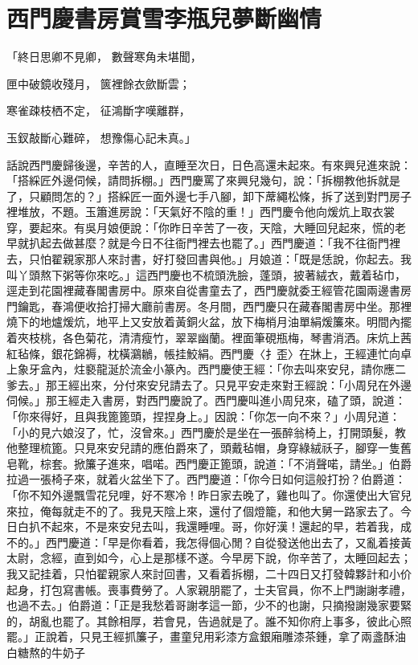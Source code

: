 %

\chapter{西門慶書房賞雪\KG 李瓶兒夢斷幽情}


「終日思卿不見卿，  數聲寒角未堪聞，

匣中破鏡收殘月，  篋裡餘衣歛斷雲；

寒雀疎枝栖不定，  征鴻斷字嘆離群，

玉釵敲斷心難碎，  想豫傷心記未真。」

話說西門慶歸後邊，辛苦的人，直睡至次日，日色高還未起來。有來興兒進來說：「搭綵匠外邊伺候，請問拆棚。」西門慶罵了來興兒幾句，說：「拆棚教他拆就是了，只顧問怎的？」搭綵匠一面外邊七手八腳，卸下蓆繩松條，拆了送到對門房子裡堆放，不題。玉簫進房說：「天氣好不陰的重！」西門慶令他向煖炕上取衣裳穿，要起來。有吳月娘便說：「你昨日辛苦了一夜，天陰，大睡回兒起來，慌的老早就扒起去做甚麼？就是今日不往衙門裡去也罷了。」西門慶道：「我不往衙門裡去，只怕翟親家那人來討書，好打發回書與他。」月娘道：「既是恁說，你起去。我叫丫頭熬下粥等你來吃。」這西門慶也不梳頭洗臉，蓬頭，披著絨衣，戴着毡巾，逕走到花園裡藏春閣書房中。原來自從書童去了，西門慶就委王經管花園兩邊書房門鑰匙，春鴻便收拾打掃大廳前書房。冬月間，西門慶只在藏春閣書房中坐。那裡燒下的地爐煖炕，地平上又安放着黃銅火盆，放下梅梢月油單絹煖簾來。明間內擺着夾枝桃，各色菊花，清清瘦竹，翠翠幽蘭。裡面筆硯瓶梅，琴書消洒。床炕上茜紅毡條，銀花錦褥，枕橫鸂鶒，帳挂鮫絹。西門慶〈扌歪〉在牀上，王經連忙向卓上象牙盒內，炷褻龍涎於流金小篆內。西門慶使王經：「你去叫來安兒，請你應二爹去。」那王經出來，分付來安兒請去了。只見平安走來對王經說：「小周兒在外邊伺候。」那王經走入書房，對西門慶說了。西門慶叫進小周兒來，磕了頭，說道：「你來得好，且與我篦篦頭，捏捏身上。」因說：「你怎一向不來？」小周兒道：「小的見六娘沒了，忙，沒曾來。」西門慶於是坐在一張醉翁椅上，打開頭髮，教他整理梳篦。只見來安兒請的應伯爵來了，頭戴毡帽，身穿綠絨祅子，腳穿一隻舊皂靴，棕套。掀簾子進來，唱喏。西門慶正篦頭，說道：「不消聲喏，請坐。」伯爵拉過一張椅子來，就着火盆坐下了。西門慶道：「你今日如何這般打扮？伯爵道：「你不知外邊飄雪花兒哩，好不寒冷！昨日家去晚了，雞也叫了。你還使出大官兒來拉，俺每就走不的了。我見天陰上來，還付了個燈籠，和他大舅一路家去了。今日白扒不起來，不是來安兒去叫，我還睡哩。哥，你好漢！還起的早，若着我，成不的。」西門慶道：「早是你看着，我怎得個心閒？自從發送他出去了，又亂着接黃太尉，念經，直到如今，心上是那樣不遂。今早房下說，你辛苦了，太睡回起去；我又記挂着，只怕翟親家人來討回書，又看着拆棚，二十四日又打發韓夥計和小价起身，打包寫書帳。喪事費勞了。人家親朋罷了，士夫官員，你不上門謝謝孝禮，也過不去。」伯爵道：「正是我愁着哥謝孝這一節，少不的也謝，只摘撥謝幾家要緊的，胡亂也罷了。其餘相厚，若會見，告過就是了。誰不知你府上事多，彼此心照罷。」正說着，只見王經抓簾子，畫童兒用彩漆方盒銀廂雕漆茶鍾，拿了兩盞酥油白糖熬的牛奶子 